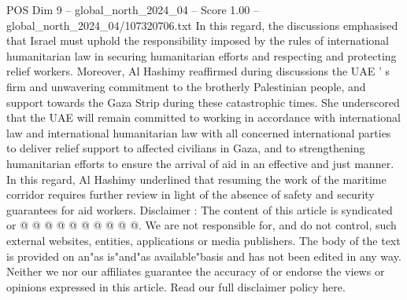\begin{textsample}{POS Dim 9 – global\_north\_2024\_04 – Score 1.00 – global\_north\_2024\_04/107320706.txt}
In this regard, the discussions emphasised that Israel must uphold the responsibility imposed by the rules of international humanitarian law in securing humanitarian efforts and respecting and protecting relief workers.
Moreover, Al Hashimy reaffirmed during discussions the UAE ' s firm and unwavering commitment to the brotherly Palestinian people, and support towards the Gaza Strip during these catastrophic times.
She underscored that the UAE will remain committed to working in accordance with international law and international humanitarian law with all concerned international parties to deliver relief support to affected civilians in Gaza, and to strengthening humanitarian efforts to ensure the arrival of aid in an effective and just manner.
In this regard, Al Hashimy underlined that resuming the work of the maritime corridor requires further review in light of the absence of safety and security guarantees for aid workers.
Disclaimer : The content of this article is syndicated or @ @ @ @ @ @ @ @ @ @.
We are not responsible for, and do not control, such external websites, entities, applications or media publishers.
The body of the text is provided on an"as is"and"as available"basis and has not been edited in any way.
Neither we nor our affiliates guarantee the accuracy of or endorse the views or opinions expressed in this article.
Read our full disclaimer policy here.

\end{textsample}
